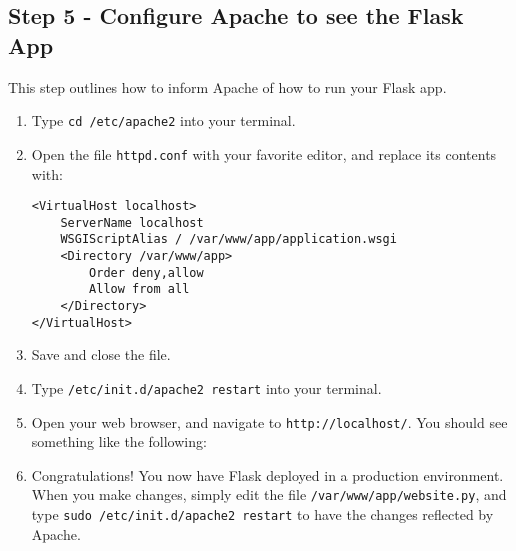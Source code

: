\documentclass{article}
\begin{document}
\subsection{Step 5 - Configure Apache to see the Flask App}
This step outlines how to inform Apache of how to run your Flask app.
\begin{enumerate}
\item Type \verb+cd /etc/apache2+ into your terminal.
\item Open the file \verb+httpd.conf+ with your favorite editor, and replace its
contents with:
\begin{verbatim}
<VirtualHost localhost>
	ServerName localhost
    WSGIScriptAlias / /var/www/app/application.wsgi
    <Directory /var/www/app>
        Order deny,allow
        Allow from all
    </Directory>
</VirtualHost>
\end{verbatim}
\item Save and close the file.
\item Type \verb+/etc/init.d/apache2 restart+ into your terminal.
\item Open your web browser, and navigate to \verb+http://localhost/+. You should see something
like the following:
\item Congratulations! You now have Flask deployed in a production environment. When you make
changes, simply edit the file \verb+/var/www/app/website.py+, and type \verb+sudo /etc/init.d/apache2 restart+ to have the changes reflected by Apache.
\end{enumerate}
\end{document}
